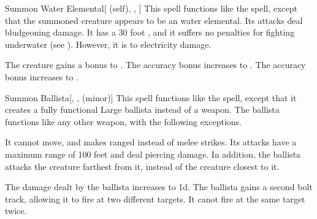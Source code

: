 \lowercase{\hypertarget{spell:Summon Water Elemental}{}}\label{spell:Summon Water Elemental}
\begin{attuneability}[Rank 2]{\hypertarget{spell:Summon Water Elemental}{Summon Water Elemental}}[ (self), , ]
This spell functions like the  spell, except that the summoned creature appears to be an water elemental.
Its attacks deal bludgeoning damage.
It has a 30 foot , and it suffers no penalties for fighting underwater (see ).
However, it is  to electricity damage.

\rankline
{} The creature gains a  bonus to .
 The accuracy bonus increases to .
 The accuracy bonus increases to .
\end{attuneability}
\vspace{0.25em}



\lowercase{\hypertarget{spell:Summon Ballista}{}}\label{spell:Summon Ballista}
\begin{freeability}[Rank 3]{\hypertarget{spell:Summon Ballista}{Summon Ballista}}[, ,  (minor)]
This spell functions like the  spell, except that it creates a fully functional Large ballista instead of a weapon.
The ballista functions like any other weapon, with the following exceptions.

It cannot move, and makes ranged  instead of melee strikes.
Its attacks have a maximum range of 100 feet and deal piercing damage.
In addition, the ballista attacks the creature farthest from it, instead of the creature closest to it.

\rankline
{} The damage dealt by the ballista increases to  \minus1d.
 The ballista gains a second bolt track, allowing it to fire at two different targets.
It canot fire at the same target twice.
\end{freeability}
\vspace{0.25em}



